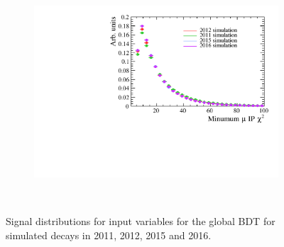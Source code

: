 \begin{figure}
 \begin{subfigure}[b]{0.48\textwidth}
        \includegraphics[width=\textwidth]{./Figs/Selection/signal_muIPS.pdf}
    \end{subfigure}
    ~ %
 



    \caption{Signal distributions for input variables for the global BDT for \bsmumu simulated decays in 2011, 2012, 2015 and 2016.}
    \label{fig:signalvars}
\end{figure}



